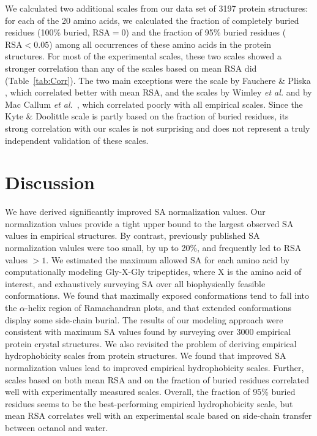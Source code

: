 \documentclass[11pt]{article}
\begin{document}
We calculated two additional scales from our data set of 3197 protein structures: for each of the 20 amino acids, we calculated the fraction of completely buried residues (100\% buried, $\text{RSA}=0$) and the fraction of 95\% buried residues ($\text{RSA}<0.05$) among all occurrences of these amino acids in the protein structures. For most of the experimental scales, these two scales showed a stronger correlation than any of the scales based on mean RSA did (Table~\ref{tab:Corr}). The two main exceptions were the scale by Fauchere \& Pliska \cite{Fauchere1983}, which correlated better with mean RSA, and the scales by Wimley \emph{et al.} \cite{Wimley1996} and by Mac Callum \emph{et al.}~\cite{MacCallum2007}, which correlated poorly with all empirical scales. Since the Kyte \& Doolittle scale \cite{Kyte1981} is partly based on the fraction of buried residues, its strong correlation with our scales is not surprising and does not represent a truly independent validation of these scales.


\section*{Discussion}

We have derived significantly improved SA normalization values. Our normalization values provide a tight upper bound to the largest observed SA values in empirical structures. By contrast, previously published SA normalization valules were too small, by up to 20\%, and frequently led to RSA values $>1$. We estimated the maximum allowed SA for each amino acid by computationally modeling Gly-X-Gly tripeptides, where X is the amino acid of interest, and exhaustively surveying SA over all biophysically feasible conformations. We found that maximally exposed conformations tend to fall into the $\alpha$-helix region of Ramachandran plots, and that extended conformations display some side-chain burial. The results of our modeling approach were consistent with maximum SA values found by surveying over 3000 empirical protein crystal structures. We also revisited the problem of deriving empirical hydrophobicity scales from protein structures. We found that improved SA normalization values lead to improved empirical hydrophobicity scales. Further, scales based on both mean RSA and on the fraction of buried residues correlated well with experimentally measured scales. Overall, the fraction of 95\% buried residues seems to be the best-performing empirical hydrophobicity scale, but mean RSA correlates well with an experimental scale based on side-chain transfer between octanol and water.
\end{document}
